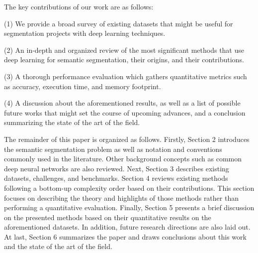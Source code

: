 The key contributions of our work are as follows:

(1) We provide a broad survey of existing datasets that might be useful for segmentation projects with deep learning techniques.

(2) An in-depth and organized review of the most signiﬁcant methods that use deep learning for semantic segmentation, their origins, and their contributions.

(3) A thorough performance evaluation which gathers quantitative metrics such as accuracy, execution time, and memory footprint.

(4) A discussion about the aforementioned results, as well as a list of possible future works that might set the course of upcoming advances, and a conclusion summarizing the state of the art of the ﬁeld.

The remainder of this paper is organized as follows. Firstly, Section 2 introduces the semantic segmentation problem as well as notation and conventions commonly used in the literature. Other background concepts such as common deep neural networks are also reviewed. Next, Section 3 describes existing datasets, challenges, and benchmarks. Section 4 reviews existing methods following a bottom-up complexity order based on their contributions. This section focuses on describing the theory and highlights of those methods rather than performing a quantitative evaluation. Finally, Section 5 presents a brief discussion on the presented methods based on their quantitative results on the aforementioned datasets. In addition, future research directions are also laid out. At last, Section 6 summarizes the paper and draws conclusions about this work and the state of the art of the ﬁeld.